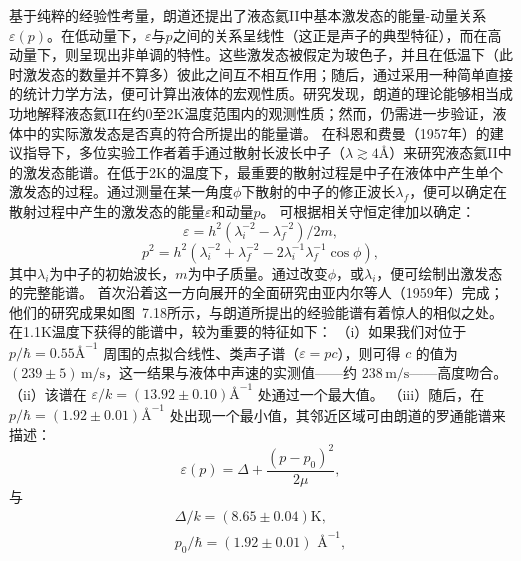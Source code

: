 基于纯粹的经验性考量，朗道还提出了液态氦II中基本激发态的能量-动量关系\(\varepsilon(p)\)。在低动量下，\(\varepsilon\)与\(p\)之间的关系呈线性（这正是声子的典型特征），而在高动量下，则呈现出非单调的特性。这些激发态被假定为玻色子，并且在低温下（此时激发态的数量并不算多）彼此之间互不相互作用；随后，通过采用一种简单直接的统计力学方法，便可计算出液体的宏观性质。研究发现，朗道的理论能够相当成功地解释液态氦II在约0至2K温度范围内的观测性质；然而，仍需进一步验证，液体中的实际激发态是否真的符合所提出的能量谱。
在科恩和费曼（1957年）的建议指导下，多位实验工作者着手通过散射长波长中子（\(\lambda \gtrsim 4\text{\AA}\)）来研究液态氦II中的激发态能谱。在低于2K的温度下，最重要的散射过程是中子在液体中产生单个激发态的过程。通过测量在某一角度\(\phi\)下散射的中子的修正波长\(\lambda_{f}\)，便可以确定在散射过程中产生的激发态的能量\(\varepsilon\)和动量\(p\)。
可根据相关守恒定律加以确定：
\begin{equation}\tag{7.5.19}\label{eq:7.5.19}
\varepsilon = h ^{2} ( \lambda _ { i } ^{- 2} - \lambda _ { f } ^{- 2} ) / 2 m ,
\end{equation}
\begin{equation}\tag{7.5.20}\label{eq:7.5.20}
p ^{2} = h ^{2} ( \lambda _ { i } ^{- 2} + \lambda _ { f } ^{- 2} - 2 \lambda _ { i } ^{- 1} \lambda _ { f } ^{- 1} \cos \phi ) ,
\end{equation}
其中\(\lambda_{i}\)为中子的初始波长，\(m\)为中子质量。通过改变\(\phi\)，或\(\lambda_{i}\)，便可绘制出激发态的完整能谱。
首次沿着这一方向展开的全面研究由亚内尔等人（1959年）完成；他们的研究成果如图~7.18所示，与朗道所提出的经验能谱有着惊人的相似之处。在1.1K温度下获得的能谱中，较为重要的特征如下：
（i）如果我们对位于 \(p/\hbar = 0.55\text{\AA}^{-1}\) 周围的点拟合线性、类声子谱（\(\varepsilon = pc\)），则可得 \(c\) 的值为 \((239 \pm 5)\,\mathrm{m/s}\)，这一结果与液体中声速的实测值——约 \(238\,\mathrm{m/s}\)——高度吻合。
（ii）该谱在 \(\varepsilon/k = (13.92 \pm 0.10)\text{\AA}^{-1}\) 处通过一个最大值。
（iii）随后，在 \(p/\hbar = (1.92 \pm 0.01)\text{\AA}^{-1}\) 处出现一个最小值，其邻近区域可由朗道的罗通能谱来描述：
\begin{equation}\tag{7.5.21}\label{eq:7.5.21}
\varepsilon ( p ) = \Delta + \frac { ( p - p _ { 0 } ) ^{2} } { 2 \mu } ,
\end{equation}
与
\begin{equation}\tag{7.5.22}\label{eq:7.5.22}
\begin{array}{r} { \Delta / k = ( 8 . 65 \pm 0 . 04 ) \mathrm { K } , } \\{ p _ { 0 } / \hbar = ( 1 . 92 \pm 0 . 01 ) \text { \AA } ^{- 1} , } \end{array}
\end{equation}
